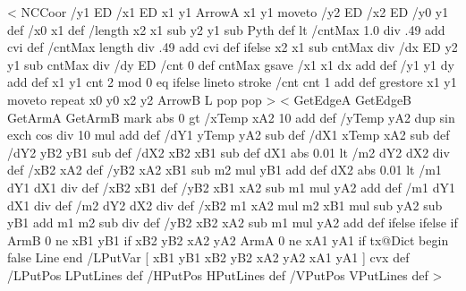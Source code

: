 %
%
%
%
<{
  NCCoor
  /y1 ED /x1 ED x1 y1 ArrowA x1 y1 moveto
  /y2 ED /x2 ED
  /y0 y1 def /x0 x1 def
  /length x2 x1 sub y2 y1 sub Pyth def
  \psk@dashNo{} lt
     {/cntMax 1.0 \psk@dashNo\space div .49 add cvi def}
     {/cntMax length \psk@dashNo\space div .49 add cvi def} ifelse
  x2 x1 sub cntMax div /dx ED
  y2 y1 sub cntMax div /dy ED
  /cnt 0 def
  cntMax {
    gsave
    /x1 x1 dx add def
    /y1 y1 dy add def
    x1 y1
    cnt 2 mod 0 eq
      { \pst@usecolor\psDashColorI }
      { \pst@usecolor\psDashColorII } ifelse
    lineto stroke
    /cnt cnt 1 add def
    grestore
    x1 y1 moveto
  } repeat
  x0 y0 x2 y2 ArrowB L pop pop%
}>
%
\def\nclineII{\pst@object{nclineII}}%
\def\nclineII@i{\check@arrow{\nclineII@ii}}%
\def\nclineII@ii#1#2{\nc@object{Open}{#1}{#2}{.5}%
    {\tx@NCLineII /LPutPos { xB yB xA yA \tx@LPutLine } def}%
}%
\def\pclineII{\pst@object{pclineII}}%
\def\pclineII@i{\pc@object\nclineII@ii}%
%
%
%
<{
  GetEdgeA GetEdgeB GetArmA GetArmB mark
  \psk@lineAngle\space abs 0 gt {
    /xTemp xA2 10 add def
    /yTemp yA2 \psk@lineAngle\space dup sin exch cos div 10 mul add def
    /dY1 yTemp yA2 sub def
    /dX1 xTemp xA2 sub def
    /dY2 yB2 yB1 sub def
    /dX2 xB2 xB1 sub def
    dX1 abs 0.01 lt {
      /m2 dY2 dX2 div def
      /xB2 xA2 def
      /yB2 xA2 xB1 sub m2 mul yB1 add def
    }{
      dX2 abs 0.01 lt {
        /m1 dY1 dX1 div def
        /xB2 xB1 def
        /yB2 xB1 xA2 sub m1 mul yA2 add def
      }{%
        /m1 dY1 dX1 div def
        /m2 dY2 dX2 div def
        /xB2 m1 xA2 mul m2 xB1 mul sub yA2 sub yB1 add m1 m2 sub div def
        /yB2 xB2 xA2 sub m1 mul yA2 add def
      } ifelse
    } ifelse
  } if
  ArmB 0 ne { xB1 yB1 } if
  xB2 yB2
  xA2 yA2
  ArmA 0 ne { xA1 yA1 } if
  tx@Dict begin false Line end
  /LPutVar [ xB1 yB1 xB2 yB2 xA2 yA2 xA1 yA1 ] cvx def
  /LPutPos { LPutLines } def
  /HPutPos { HPutLines } def
  /VPutPos { VPutLines } def
}>
